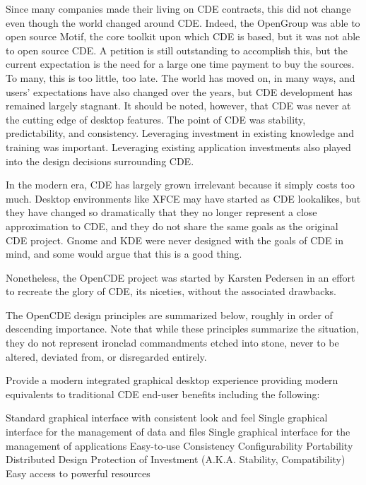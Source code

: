 Since many companies made their living on CDE contracts, this did not
change even though the world changed around CDE. Indeed, the OpenGroup
was able to open source Motif, the core toolkit upon which CDE is based,
but it was not able to open source CDE. A petition is still outstanding
to accomplish this, but the current expectation is the need for a large
one time payment to buy the sources. To many, this is too little, too
late. The world has moved on, in many ways, and users’ expectations have
also changed over the years, but CDE development has remained largely
stagnant. It should be noted, however, that CDE was never at the cutting
edge of desktop features. The point of CDE was stability,
predictability, and consistency. Leveraging investment in existing
knowledge and training was important. Leveraging existing application
investments also played into the design decisions surrounding CDE.

In the modern era, CDE has largely grown irrelevant because it simply
costs too much. Desktop environments like XFCE may have started as CDE
lookalikes, but they have changed so dramatically that they no longer
represent a close approximation to CDE, and they do not share the same
goals as the original CDE project. Gnome and KDE were never designed
with the goals of CDE in mind, and some would argue that this is a good
thing. 

Nonetheless, the OpenCDE project was started by Karsten Pedersen in an
effort to recreate the glory of CDE, its niceties, without the
associated drawbacks. 

The OpenCDE design principles are summarized below, roughly
in order of descending importance. Note that while these
principles summarize the situation, they do not represent ironclad
commandments etched into stone, never to be altered, deviated from, or
disregarded entirely.

\numberedlist

\li Provide a modern integrated graphical desktop experience providing
modern equivalents to traditional CDE end-user benefits including the
following:

  \unorderedlist
  \li Standard graphical interface with consistent look and feel
  \li Single graphical interface for the management of data and files
  \li Single graphical interface for the management of applications
  \li Easy-to-use%
  \li Consistency
  \li Configurability
  \li Portability
  \li Distributed Design
  \li Protection of Investment (A.K.A. Stability, Compatibility)
  \li Easy access to powerful resources
  \endunorderedlist

